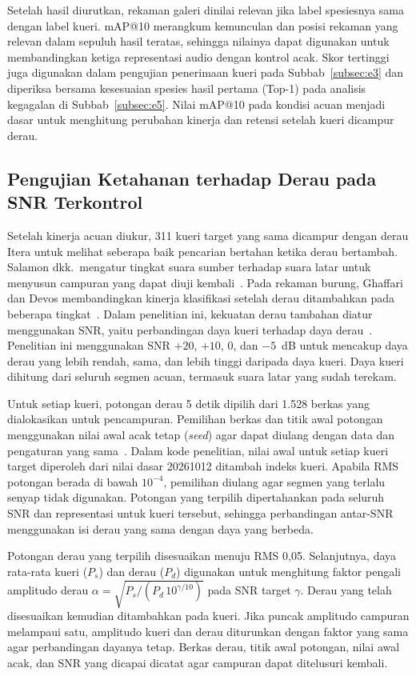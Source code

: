Setelah hasil diurutkan, rekaman galeri dinilai relevan jika label spesiesnya sama dengan label kueri. mAP@10 merangkum kemunculan dan posisi rekaman yang relevan dalam sepuluh hasil teratas, sehingga nilainya dapat digunakan untuk membandingkan ketiga representasi audio dengan kontrol acak. Skor tertinggi juga digunakan dalam pengujian penerimaan kueri pada Subbab~\ref{subsec:e3} dan diperiksa bersama kesesuaian spesies hasil pertama (Top-1) pada analisis kegagalan di Subbab~\ref{subsec:e5}. Nilai mAP@10 pada kondisi acuan menjadi dasar untuk menghitung perubahan kinerja dan retensi setelah kueri dicampur derau.

\subsection{Pengujian Ketahanan terhadap Derau pada SNR Terkontrol}
\label{subsec:e2}

Setelah kinerja acuan diukur, 311 kueri target yang sama dicampur dengan derau Itera untuk melihat seberapa baik pencarian bertahan ketika derau bertambah. Salamon dkk.\ mengatur tingkat suara sumber terhadap suara latar untuk menyusun campuran yang dapat diuji kembali~\cite{salamon2017scaper}. Pada rekaman burung, Ghaffari dan Devos membandingkan kinerja klasifikasi setelah derau ditambahkan pada beberapa tingkat~\cite{ghaffari2024frontends}. Dalam penelitian ini, kekuatan derau tambahan diatur menggunakan SNR, yaitu perbandingan daya kueri terhadap daya derau~\cite{chen2023biotic}. Penelitian ini menggunakan SNR $+20$, $+10$, $0$, dan $-5$~dB untuk mencakup daya derau yang lebih rendah, sama, dan lebih tinggi daripada daya kueri. Daya kueri dihitung dari seluruh segmen acuan, termasuk suara latar yang sudah terekam.

Untuk setiap kueri, potongan derau 5 detik dipilih dari 1.528 berkas yang dialokasikan untuk pencampuran. Pemilihan berkas dan titik awal potongan menggunakan nilai awal acak tetap (\textit{seed}) agar dapat diulang dengan data dan pengaturan yang sama~\cite{numpyRandomGenerator}. Dalam kode penelitian, nilai awal untuk setiap kueri target diperoleh dari nilai dasar 20261012 ditambah indeks kueri. Apabila RMS potongan berada di bawah $10^{-4}$, pemilihan diulang agar segmen yang terlalu senyap tidak digunakan. Potongan yang terpilih dipertahankan pada seluruh SNR dan representasi untuk kueri tersebut, sehingga perbandingan antar-SNR menggunakan isi derau yang sama dengan daya yang berbeda.

Potongan derau yang terpilih disesuaikan menuju RMS 0{,}05. Selanjutnya, daya rata-rata kueri ($P_s$) dan derau ($P_d$) digunakan untuk menghitung faktor pengali amplitudo derau $\alpha=\sqrt{P_s/(P_d\,10^{\gamma/10})}$ pada SNR target $\gamma$. Derau yang telah disesuaikan kemudian ditambahkan pada kueri. Jika puncak amplitudo campuran melampaui satu, amplitudo kueri dan derau diturunkan dengan faktor yang sama agar perbandingan dayanya tetap. Berkas derau, titik awal potongan, nilai awal acak, dan SNR yang dicapai dicatat agar campuran dapat ditelusuri kembali.

